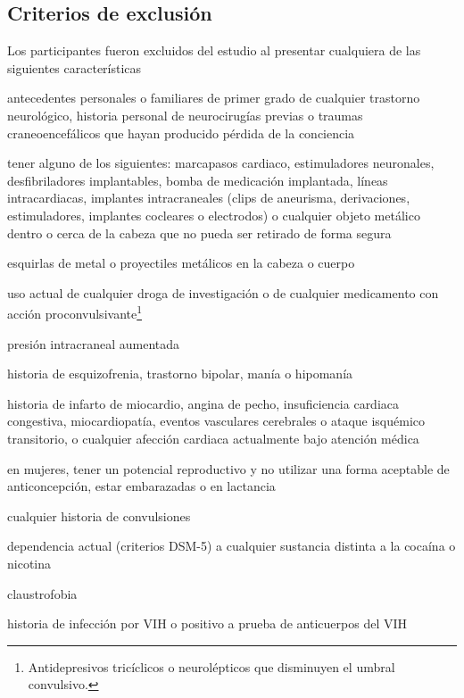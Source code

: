 \subsection{Criterios de exclusión}
Los participantes fueron excluidos del estudio al presentar cualquiera de las siguientes características
\begin{enumerate*}[label=\emph{\alph*}), before=\unskip{: }, itemjoin={{; }}, itemjoin*={{, o }}]
    \item antecedentes personales o familiares de primer grado de cualquier trastorno neurológico, historia personal de neurocirugías previas o traumas craneoencefálicos que hayan producido pérdida de la conciencia
    \item tener alguno de los siguientes: marcapasos cardiaco, estimuladores neuronales, desfibriladores implantables, bomba de medicación implantada, líneas intracardiacas, implantes intracraneales (clips de aneurisma, derivaciones, estimuladores, implantes cocleares o electrodos) o cualquier objeto metálico dentro o cerca de la cabeza que no pueda ser retirado de forma segura
    \item esquirlas de metal o proyectiles metálicos en la cabeza o cuerpo
    \item uso actual de cualquier droga de investigación o de cualquier medicamento con acción proconvulsivante\footnote{Antidepresivos tricíclicos o neurolépticos que disminuyen el umbral convulsivo.}
    \item presión intracraneal aumentada
    \item historia de esquizofrenia, trastorno bipolar, manía o hipomanía
    \item historia de infarto de miocardio, angina de pecho, insuficiencia cardiaca congestiva, miocardiopatía, eventos vasculares cerebrales o ataque isquémico transitorio, o cualquier afección cardiaca actualmente bajo atención médica
    \item en mujeres, tener un potencial reproductivo y no utilizar una forma aceptable de anticoncepción, estar embarazadas o en lactancia
    \item cualquier historia de convulsiones
    \item dependencia actual (criterios DSM-5) a cualquier sustancia distinta a la cocaína o nicotina
    \item claustrofobia
    \item historia de infección por VIH o positivo a prueba de anticuerpos del VIH
\end{enumerate*}


